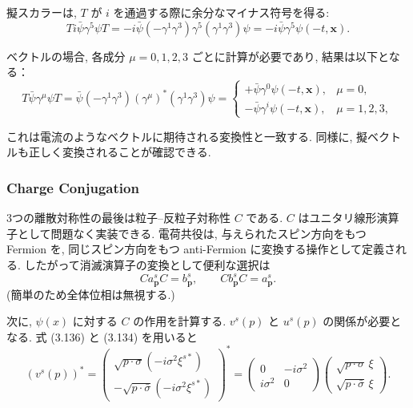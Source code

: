 \documentclass[a4paper,12pt]{article}
\begin{document}
擬スカラーは, $T$ が $i$ を通過する際に余分なマイナス符号を得る:
\begin{equation*}
T i\bar{\psi}\gamma^5\psi T 
= -i\bar{\psi}(-\gamma^1\gamma^3)\gamma^5(\gamma^1\gamma^3)\psi 
= -i\bar{\psi}\gamma^5\psi(-t,\mathbf{x}).
\end{equation*}

ベクトルの場合, 各成分 $\mu=0,1,2,3$ ごとに計算が必要であり, 結果は以下となる：
\begin{equation*}
T\bar{\psi}\gamma^\mu\psi T 
= \bar{\psi}(-\gamma^1\gamma^3)(\gamma^\mu)^*(\gamma^1\gamma^3)\psi
= 
\begin{cases}
+\bar{\psi}\gamma^0\psi(-t,\mathbf{x}), & \mu=0, \\
-\bar{\psi}\gamma^i\psi(-t,\mathbf{x}), & \mu=1,2,3,
\end{cases}
\tag{3.142}
\end{equation*}

これは電流のようなベクトルに期待される変換性と一致する.  
同様に, 擬ベクトルも正しく変換されることが確認できる.

\subsubsection*{Charge Conjugation}

3つの離散対称性の最後は粒子–反粒子対称性 $C$ である.  
$C$ はユニタリ線形演算子として問題なく実装できる.  
電荷共役は, 与えられたスピン方向をもつ Fermion を, 同じスピン方向をもつ anti-Fermion に変換する操作として定義される.  
したがって消滅演算子の変換として便利な選択は
\begin{equation*}
C a^s_{\mathbf{p}} C = b^s_{\mathbf{p}}, 
\qquad 
C b^s_{\mathbf{p}} C = a^s_{\mathbf{p}} .
\tag{3.143}
\end{equation*}
(簡単のため全体位相は無視する.)

次に, $\psi(x)$ に対する $C$ の作用を計算する.  
$v^s(p)$ と $u^s(p)$ の関係が必要となる.  
式 (3.136) と (3.134) を用いると
\begin{equation*}
(v^s(p))^* = 
\begin{pmatrix}
\sqrt{p\cdot\sigma}(-i\sigma^2\xi^{s*}) \\
-\sqrt{p\cdot\bar\sigma}(-i\sigma^2\xi^{s*})
\end{pmatrix}^*
= \begin{pmatrix}
0 & -i\sigma^2 \\ i\sigma^2 & 0
\end{pmatrix}
\begin{pmatrix}
\sqrt{p\cdot\sigma}\,\xi \\ \sqrt{p\cdot\bar\sigma}\,\xi
\end{pmatrix}.
\end{equation*}
\end{document}
